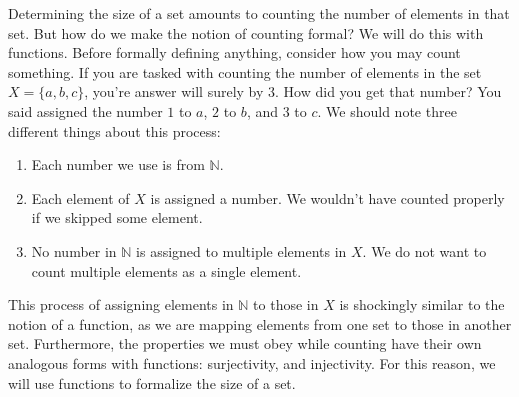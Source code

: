 \documentclass{article}
\newcommand{\N}{\mathbb{N}}
\theoremstyle{definition}
\begin{document}
	Determining the size of a set amounts to counting the number of elements in that set. But how do we make the notion of counting formal? We will do this with functions. Before formally defining anything, consider how you may count something. If you are tasked with counting the number of elements in the set $ X=\{a,b,c\} $, you're answer will surely by 3. How did you get that number? You said assigned the number $ 1 $ to $ a $, $ 2 $ to $ b $, and $ 3 $ to $ c $. We should note three different things about this process:
	\begin{enumerate}
		\item Each number we use is from $ \N $.
		\item Each element of $ X $ is assigned a number. We wouldn't have counted properly if we skipped some element. 
		\item No number in $ \N $ is assigned to multiple elements in $ X $. We do not want to count multiple elements as a single element.
	\end{enumerate}
	This process of assigning elements in $ \N $ to those in $ X $ is shockingly similar to the notion of a function, as we are mapping elements from one set to those in another set. Furthermore, the properties we must obey while counting have their own analogous forms with functions: surjectivity, and injectivity. For this reason, we will use functions to formalize the size of a set.
	
\end{document}
